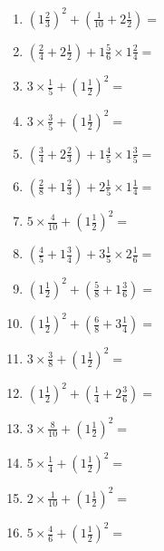\documentclass[12pt]{article}
\begin{document}
\begin{enumerate}
\item \large $ (1 \frac{2}{3})^2 + (\frac{1}{10} + 2 \frac{1}{2}) = $ \vspace{1.8cm}
\item \large $ (\frac{2}{4} + 2 \frac{1}{2}) + 1 \frac{5}{6} \times 1 \frac{2}{4} = $ \vspace{1.8cm}
\item \large $ 3 \times \frac{1}{5} + (1 \frac{1}{2})^2 = $ \vspace{1.8cm}
\item \large $ 3 \times \frac{3}{5} + (1 \frac{1}{2})^2 = $ \vspace{1.8cm}
\item \large $ (\frac{3}{4} + 2 \frac{2}{3}) + 1 \frac{4}{5} \times 1 \frac{3}{5} = $ \vspace{1.8cm}
\item \large $ (\frac{2}{8} + 1 \frac{2}{3}) + 2 \frac{1}{5} \times 1 \frac{1}{4} = $ \vspace{1.8cm}
\newpage
\item \large $ 5 \times \frac{4}{10} + (1 \frac{1}{2})^2 = $ \vspace{1.8cm}
\item \large $ (\frac{4}{5} + 1 \frac{3}{4}) + 3 \frac{1}{5} \times 2 \frac{1}{6} = $ \vspace{1.8cm}
\item \large $ (1 \frac{1}{2})^2 + (\frac{5}{8} + 1 \frac{3}{6}) = $ \vspace{1.8cm}
\item \large $ (1 \frac{1}{2})^2 + (\frac{6}{8} + 3 \frac{1}{4}) = $ \vspace{1.8cm}
\item \large $ 3 \times \frac{3}{8} + (1 \frac{1}{2})^2 = $ \vspace{1.8cm}
\item \large $ (1 \frac{1}{2})^2 + (\frac{1}{4} + 2 \frac{3}{6}) = $ \vspace{1.8cm}
\item \large $ 3 \times \frac{8}{10} + (1 \frac{1}{2})^2 = $ \vspace{1.8cm}
\item \large $ 5 \times \frac{1}{4} + (1 \frac{1}{2})^2 = $ \vspace{1.8cm}
\item \large $ 2 \times \frac{1}{10} + (1 \frac{1}{2})^2 = $ \vspace{1.8cm}
\item \large $ 5 \times \frac{4}{6} + (1 \frac{1}{2})^2 = $ \vspace{1.8cm}

\end{enumerate}
\end{document}
